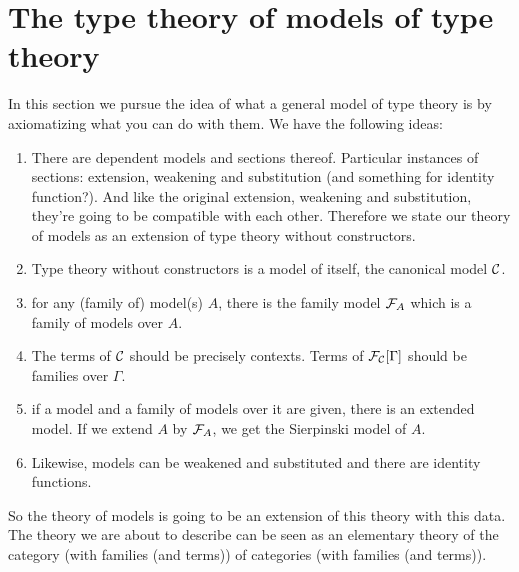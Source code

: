 \section{The type theory of models of type theory}
In this section we pursue the idea of what a general model of type theory is by
axiomatizing what you can do with them. We have the following ideas:
\begin{enumerate}
\item There are dependent models and sections thereof. Particular instances
of sections: extension, weakening and substitution (and something for identity
function?). And like the original
extension, weakening and substitution, they're going to be compatible with each
other. Therefore we state our theory of models as an extension of type theory
without constructors.
\item Type theory without constructors is a model of itself, the canonical model $\mathcal{C}$.
\item for any (family of) model(s) $A$, there is the family model $\mfam{A}$ which
is a family of models over $A$.
\item The terms of $\mathcal{C}$ should be precisely contexts. Terms of $\subst{\Gamma}{\mfam{\mctx}}$
should be families over $\Gamma$.
\item if a model and a family of models over it are given, there is an extended model.
If we extend $A$ by $\mfam{A}$, we get the Sierpinski model of $A$.
\item Likewise, models can be weakened and substituted and there are identity
functions.
\end{enumerate}
So the theory of models is going to be an extension of this theory with this
data. The theory we are about to describe can be seen as an elementary theory
of the category (with families (and terms)) of categories (with families (and terms)).

